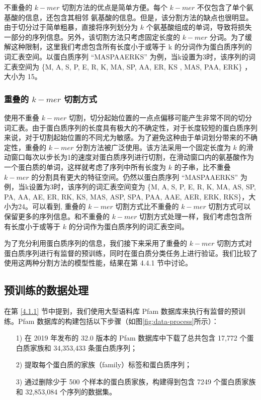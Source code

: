 不重叠的 $k-mer$ 切割方法的优点是简单方便。每个 $k-mer$ 不仅包含了单个氨基酸的信息，还包含其相邻 氨基酸的信息。但是，该分割方法的缺点也很明显。由于切分过于简单粗暴，直接将序列划分为 $k$ 个氨基酸组成的单词，导致将损失一部分的序列信息。另外，该切割方法只考虑固定长度的 $k-mer$ 分词。为了缓解这种限制，这里我们考虑包含所有长度小于或等于 k 的分词作为蛋白质序列的词汇表空间。以蛋白质序列 “MASPAAERKS” 为例，当k设置为3时，该序列的词汇表空间为
\{M, A, S, P, E, R, K, MA, SP, AA, ER, KS , MAS, PAA, ERK\} ，大小为 15。

\subsubsection{重叠的 $k-mer$ 切割方式}
使用不重叠 $k-mer$ 切割，切分起始位置的一点点偏移可能产生非常不同的切分词汇表。由于蛋白质序列的长度具有极大的不确定性，对于长度较短的蛋白质序列来说，对于切割起始位置的不同尤为敏感。为了避免这种由于单词划分带来的不确定性，重叠的 $k-mer$ 分割方法被广泛使用。该方法采用一个固定长度为 $k$ 的滑动窗口每次以步长为1的速度对蛋白质序列进行切割，在滑动窗口内的氨基酸作为一个蛋白质的单词，这样就考虑了序列中所有长度为 $k$ 的子串，比不重叠 $k-mer$ 的分割具有更大的特征空间。仍然以蛋白质序列 “MASPAAERKS” 为例，当k设置为3时，该序列的词汇表空间变为 \{M, A, S, P, E, R, K, MA, AS, SP, PA, AA, AE, ER, RK, KS, MAS, ASP, SPA, PAA, AAE, AER, ERK, RKS\}，大小为24。可以看到, 重叠的 $k-mer$ 切割方式比不重叠的 $k-mer$ 切割方式可以保留更多的序列信息。和不重叠的 $k-mer$ 切割方式处理一样，我们考虑包含所有长度小于或等于 $k$ 的分词作为蛋白质序列的词汇表空间。

为了充分利用蛋白质序列的信息，我们接下来采用了重叠的 $k-mer$ 切割方式对蛋白质序列进行有监督的预训练，同时在蛋白质分类任务上进行验证。我们比较了使用这两种分割方法的模型性能，结果在第 4.4.1 节中讨论。

\subsection{预训练的数据处理}
在第 \ref{4.1.1} 节中提到，我们使用大型语料库 Pfam 数据库来执行有监督的预训练。Pfam 数据库的构建包括以下步骤（如图\ref{fig:data-process}所示）：
\begin{itemize}
    \item [1)] 
    在 2019 年发布的 32.0 版本的 Pfam 数据库中下载了总共包含 17,772 个蛋白质家族和 34,353,433 条蛋白质序列； 
    \item [2)]
    提取每个蛋白质的家族（family）标签和蛋白质序列；
    \item [3)]
    通过删除少于 500 个样本的蛋白质家族，构建得到包含 7249 个蛋白质家族和 32,853,084 个序列的数据集。
  \end{itemize}

